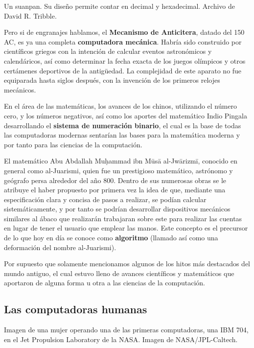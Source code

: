 {Un suanpan. Su diseño permite contar en decimal y hexadecimal.}
{Archivo de David R. Tribble.}

Pero si de engranajes hablamos, el \textbf{Mecanismo de Anticitera}, datado del
150 AC, es ya una completa \textbf{computadora mecánica}. Habría sido construido
por científicos griegos con la intención de calcular eventos astronómicos y
calendáricos, así como determinar la fecha exacta de los juegos olímpicos y
otros certámenes deportivos de la antigüedad. La complejidad de este aparato no
fue equiparada hasta siglos después, con la invención de los primeros relojes
mecánicos.\autocite{lin_2016}

En el área de las matemáticas, los avances de los chinos, utilizando el número
cero, y los números negativos, así como los aportes del matemático Indio Pingala
desarrollando el \textbf{sistema de numeración binario}, el cual es la base de
todas las computadoras modernas sentarían las bases para la matemática moderna
y por tanto para las ciencias de la computación.

El matemático Abu Abdallah Mu\d{h}ammad ibn M\={u}s\={a} al-Jw\={a}rizm\={i},
conocido en general como al-Juarismi, quien fue un prestigioso matemático,
astrónomo y geógrafo persa alrededor del año 800. Dentro de sus numerosas obras
se le atribuye el haber propuesto por primera vez la idea de que, mediante una
especificación clara y concisa de pasos a realizar, se podían calcular
sistemáticamente, y por tanto se podrían desarrollar dispositivos mecánicos
similares al ábaco que realizarán trabajaran sobre este para realizar las
cuentas en lugar de tener el usuario que emplear las manos. Este concepto es el
precursor de lo que hoy en día se conoce como \textbf{algoritmo} (llamado así
como una deformación del nombre al-Juarismi).

Por supuesto que solamente mencionamos algunos de los hitos más destacados del
mundo antiguo, el cual estuvo lleno de avances científicos y matemáticos que
aportaron de alguna forma u otra a las ciencias de la computación.

\subsection{Las computadoras humanas}

{Imagen de una mujer operando una de las primeras computadoras, una IBM 704,
en el Jet Propulsion Laboratory de la NASA.}
{Imagen de NASA/JPL-Caltech.}

